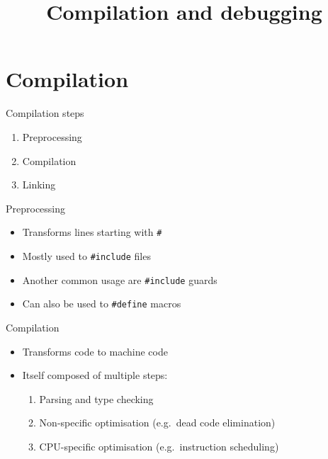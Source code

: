 

\title{Compilation and debugging}



\maketitle

\section{Compilation}

\begin{frame}{Compilation steps}
    \begin{enumerate}
        \item Preprocessing
        \item Compilation
        \item Linking
    \end{enumerate}
\end{frame}

\begin{frame}[fragile]{Preprocessing}
    \begin{itemize}
        \item Transforms lines starting with \texttt{#}
        \item Mostly used to \texttt{#include} files
        \item Another common usage are \texttt{#include} guards
        \item Can also be used to \texttt{#define} macros
    \end{itemize}
\end{frame}

\begin{frame}{Compilation}
    \begin{itemize}
        \item Transforms code to machine code
        \item Itself composed of multiple steps:
              \begin{enumerate}
                  \item Parsing and type checking
                  \item Non\hyp{}specific optimisation
                        (e.g.\ dead code elimination)
                  \item CPU\hyp{}specific optimisation
                        (e.g.\ instruction scheduling)
              \end{enumerate}
    \end{itemize}
\end{frame}

